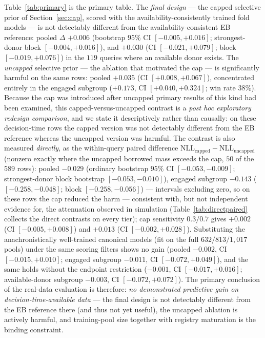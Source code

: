 \documentclass[11pt]{article}
\begin{document}
Table~\ref{tab:primary} is the primary table. The \emph{final design} --- the
capped selective prior of Section~\ref{sec:cap}, scored with the
availability-consistently trained fold models --- is not detectably
different from the availability-consistent EB reference: pooled $\Delta$
$+0.006$ (bootstrap $95\%$ CI $[-0.005, +0.016]$; strongest-donor block
$[-0.004, +0.016]$), and $+0.030$ (CI $[-0.021, +0.079]$; block
$[-0.019, +0.076]$) in the $119$ queries where an available donor exists.
The \emph{uncapped} selective prior --- the ablation that motivated the cap
--- is significantly harmful on the same rows: pooled $+0.035$
(CI $[+0.008, +0.067]$), concentrated entirely in the engaged subgroup
($+0.173$, CI $[+0.040, +0.324]$; win rate $38\%$). Because the cap was
introduced after uncapped primary results of this kind had been examined,
this capped-versus-uncapped contrast is a \emph{post hoc exploratory
redesign comparison}, and we state it descriptively rather than causally:
on these decision-time rows the capped version was not detectably
different from the EB reference whereas the uncapped version was harmful.
The contrast is also measured \emph{directly}, as the within-query paired
difference $\mathrm{NLL}_{\mathrm{capped}} -
\mathrm{NLL}_{\mathrm{uncapped}}$ (nonzero exactly where the uncapped
borrowed mass exceeds the cap, $50$ of the $589$ rows): pooled $-0.029$
(ordinary bootstrap $95\%$ CI $[-0.053,-0.009]$; strongest-donor block
bootstrap $[-0.053,-0.010]$), engaged subgroup $-0.143$
($[-0.258,-0.048]$; block $[-0.258,-0.056]$) --- intervals excluding
zero, so on these rows the cap reduced the harm --- consistent with, but
not independent
evidence for, the attenuation observed in simulation
(Table~\ref{tab:directpaired} collects the direct contrasts on every
tier); cap sensitivity
$0.3/0.7$ gives $+0.002$ (CI $[-0.005,+0.008]$) and $+0.013$
(CI $[-0.002,+0.028]$). Substituting the anachronistically well-trained
canonical models (fit on the full $632/813/1{,}017$ pools) under the same
scoring filters shows no gain (pooled $-0.002$, CI $[-0.015, +0.010]$;
engaged subgroup $-0.011$, CI $[-0.072, +0.049]$), and the same holds
without the endpoint restriction ($-0.001$, CI $[-0.017, +0.016]$;
available-donor subgroup $-0.003$, CI $[-0.072, +0.072]$). The primary
conclusion of the real-data evaluation is therefore: \emph{no demonstrated
predictive gain on decision-time-available data} --- the final design is
not detectably different from the EB reference there (and thus not yet
useful), the uncapped ablation is
actively harmful,
and training-pool size together with registry maturation is the binding
constraint.
\end{document}
